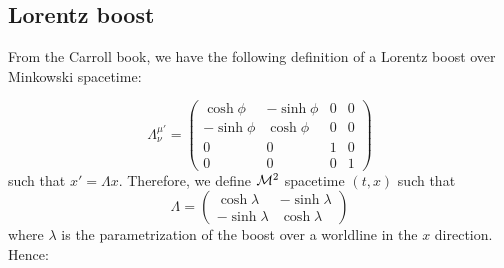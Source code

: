 \documentclass{article}
\begin{document}
 		\subsection{Lorentz boost}
 		From the Carroll book, we have the following definition of a Lorentz boost over Minkowski spacetime:
 		
 		$$ \Lambda_\nu^{\mu'} = \begin{pmatrix}
 			\cosh \phi	&	- \sinh \phi	&	0	&	0	\\
 			-\sinh \phi & \cosh \phi &	0	&	0	\\
 			0	&	0	&	1	&	0 \\
 			0	&	0	&	0	&	1
 		\end{pmatrix}$$
 		such that $x' = \Lambda x$. Therefore, we define $\mathcal{M}^2$ spacetime $(t,x)$ such that
 		$$ \Lambda = \begin{pmatrix}
 			\cosh \lambda & - \sinh \lambda \\
 			- \sinh\lambda & \cosh \lambda
 		\end{pmatrix} $$
 		where $\lambda$ is the parametrization of the boost over a worldline in the $x$ direction. Hence:
 		
\end{document}
